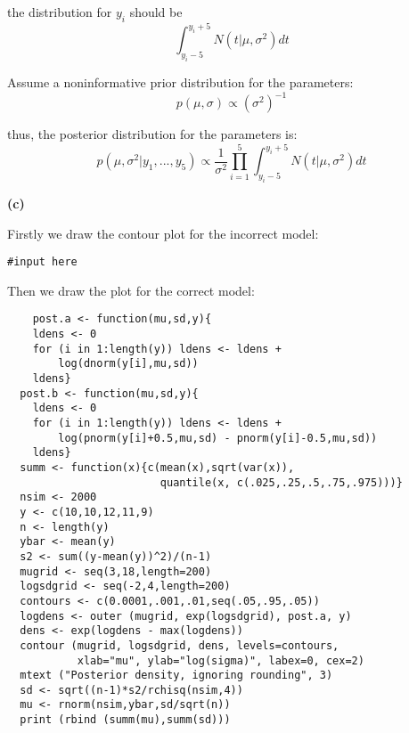 \documentclass[letterpaper,11pt]{article}
\begin{document}
the distribution for $y_i$ should be $$\int_{y_i-5}^{y_i+5}N(t\vert\mu,\sigma^2)dt$$

Assume a noninformative prior distribution for the parameters:
$$p(\mu,\sigma)\propto (\sigma^2)^{-1}$$

thus, the posterior distribution for the parameters is:
$$p(\mu,\sigma^2\vert y_1,...,y_5)\propto\frac{1}{\sigma^2}\prod_{i=1}^{5}\int_{y_i-5}^{y_i+5}N(t\vert\mu,\sigma^2)dt$$


\begin{addmargin}[-1.1em]{0em} \textbf{(c)}\par \end{addmargin}

Firstly we draw the contour plot for the incorrect model:

\begin{lstlisting}
#input here
\end{lstlisting}

Then we draw the plot for the correct model:

\begin{lstlisting}
    post.a <- function(mu,sd,y){
    ldens <- 0
    for (i in 1:length(y)) ldens <- ldens +
        log(dnorm(y[i],mu,sd))
    ldens}
  post.b <- function(mu,sd,y){
    ldens <- 0
    for (i in 1:length(y)) ldens <- ldens +
        log(pnorm(y[i]+0.5,mu,sd) - pnorm(y[i]-0.5,mu,sd))
    ldens}
  summ <- function(x){c(mean(x),sqrt(var(x)),
                        quantile(x, c(.025,.25,.5,.75,.975)))}
  nsim <- 2000
  y <- c(10,10,12,11,9)
  n <- length(y)
  ybar <- mean(y)
  s2 <- sum((y-mean(y))^2)/(n-1)
  mugrid <- seq(3,18,length=200)
  logsdgrid <- seq(-2,4,length=200)
  contours <- c(0.0001,.001,.01,seq(.05,.95,.05))
  logdens <- outer (mugrid, exp(logsdgrid), post.a, y)
  dens <- exp(logdens - max(logdens))
  contour (mugrid, logsdgrid, dens, levels=contours,
           xlab="mu", ylab="log(sigma)", labex=0, cex=2)
  mtext ("Posterior density, ignoring rounding", 3)
  sd <- sqrt((n-1)*s2/rchisq(nsim,4))
  mu <- rnorm(nsim,ybar,sd/sqrt(n))
  print (rbind (summ(mu),summ(sd)))
\end{lstlisting}

\begin{center}
  \makebox[\linewidth]{\texttt{[image: 4640HW51]}}
\end{center}
\end{document}
